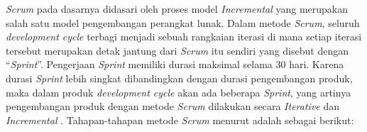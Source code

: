 \par \textit{Scrum} pada dasarnya didasari oleh proses model \textit{Incremental} yang merupakan salah satu model pengembangan perangkat lunak. Dalam metode \textit{Scrum}, seluruh \textit{development cycle} terbagi menjadi sebuah rangkaian iterasi di mana setiap iterasi tersebut merupakan detak jantung dari \textit{Scrum} itu sendiri yang disebut dengan “\textit{Sprint}”. Pengerjaan \textit{Sprint} memiliki durasi maksimal selama 30 hari. Karena durasi \textit{Sprint} lebih singkat dibandingkan dengan durasi pengembangan produk, maka dalam produk \textit{development cycle} akan ada beberapa \textit{Sprint}, yang artinya pengembangan produk dengan metode \textit{Scrum} dilakukan secara \textit{Iterative} dan \textit{Incremental} \citep{Mundra2013}. Tahapan-tahapan metode \textit{Scrum} menurut \cite{Schwab2013} adalah sebagai berikut:

